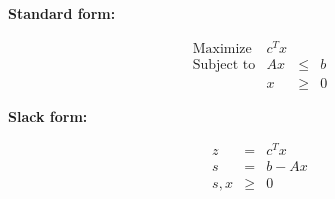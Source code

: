 \begin{minipage}[t]{0.45\linewidth}
    \begin{center} \textbf{Standard form:} \end{center}
    \[ \begin{matrix}
        \text{Maximize}   & c^Tx &     &   \\
        \text{Subject to} & Ax   & \le & b \\
                          & x    & \ge & 0
    \end{matrix} \]
\end{minipage}
\hfil%
\begin{minipage}[t]{0.45\linewidth}
    \begin{center} \textbf{Slack form:} \end{center}
    \[ \begin{matrix}
        z    & =   & c^Tx   \\
        s    & =   & b - Ax \\
        s, x & \ge & 0
    \end{matrix} \]
\end{minipage}

